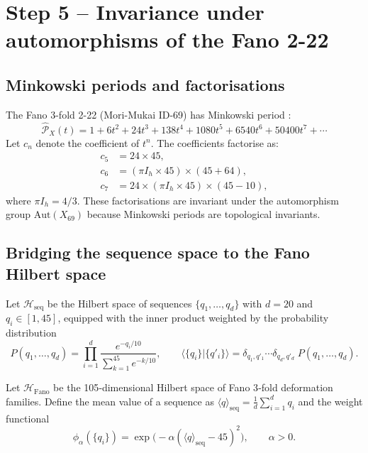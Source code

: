 \documentclass[12pt]{article}
\begin{document}
\section{Step 5 – Invariance under automorphisms of the Fano 2-22}

\subsection{Minkowski periods and factorisations}

The Fano 3-fold 2-22 (Mori-Mukai ID-69) has Minkowski period \cite{coates2013,grdb}:
\begin{equation}\label{eq:minkowski}
\widehat{\mathcal{P}}_X(t) = 1 + 6t^2 + 24t^3 + 138t^4 + 1080t^5 + 6540t^6 + 50400t^7 + \cdots
\end{equation}
Let \(c_n\) denote the coefficient of \(t^n\). The coefficients factorise as:
\begin{align}
c_5 &= 24 \times 45,\\
c_6 &= (\pi I_h \times 45) \times (45+64),\\
c_7 &= 24 \times (\pi I_h \times 45) \times (45-10),
\end{align}
where \(\pi I_h = 4/3\). These factorisations are invariant under the automorphism group \(\text{Aut}(X_{69})\) because Minkowski periods are topological invariants.

\subsection{Bridging the sequence space to the Fano Hilbert space}

Let \(\mathcal{H}_{\text{seq}}\) be the Hilbert space of sequences \(\{q_1,\dots,q_d\}\) with \(d=20\) and \(q_i\in[1,45]\), equipped with the inner product weighted by the probability distribution
\begin{equation}
P(q_1,\dots,q_d) = \prod_{i=1}^{d} \frac{e^{-q_i/10}}{\sum_{k=1}^{45} e^{-k/10}},\qquad \langle \{q_i\} | \{q'_i\} \rangle = \delta_{q_1,q'_1}\cdots\delta_{q_d,q'_d}\; P(q_1,\dots,q_d).
\end{equation}

Let \(\mathcal{H}_{\text{Fano}}\) be the 105‑dimensional Hilbert space of Fano 3‑fold deformation families. Define the mean value of a sequence as \(\langle q\rangle_{\text{seq}} = \frac{1}{d}\sum_{i=1}^{d} q_i\) and the weight functional
\begin{equation}
\phi_\alpha(\{q_i\}) = \exp\!\bigl(-\alpha(\langle q\rangle_{\text{seq}}-45)^2\bigr),\qquad \alpha>0.
\end{equation}
\end{document}
